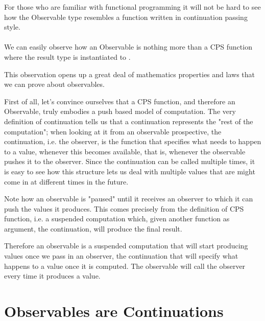 For those who are familiar with functional programming it will not be hard to see how the Observable type resembles a function written in continuation passing style.\\

\\

We can easily observe how an Observable is nothing more than a CPS function where the result type  is instantiated to .

This observation opens up a great deal of mathematics properties and laws that we can prove about observables.

First of all, let's convince ourselves that a CPS function, and therefore an Observable, truly embodies a push based model of computation. The very definition of continuation tells us that a continuation represents the "rest of the computation"; when looking at it from an observable prospective, the continuation, i.e. the observer, is the function that specifies what needs to happen to a value, whenever this becomes available, that is, whenever the observable pushes it to the observer. Since the continuation can be called multiple times, it is easy to see how this structure lets us deal with multiple values that are might come in at different times in the future.

Note how an observable is "paused" until it receives an observer to which it can push the values it produces. This comes precisely from the definition of CPS function, i.e. a suspended computation which, given another function as argument, the continuation, will produce the final result.  

Therefore an observable is a suspended computation that will start producing values once we pass in an observer, the continuation that will specify what happens to a value once it is computed. The observable will call the observer every time it produces a value.

\section{Observables are Continuations}
\label{sec:sec03}


